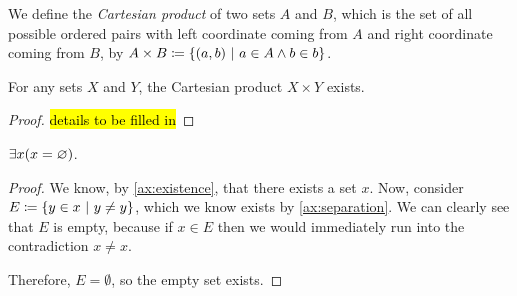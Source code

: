 % 
%         
% 
% 
% 

\begin{definition}
    We define the \emph{Cartesian product} of two sets \(A\) and \(B\),
    which is the set of all possible ordered pairs with
    left coordinate coming from \(A\) and right coordinate coming from \(B\),
    by \(A \times B \defn \set*{(a, b) \suchthat a \in A \meet b \in b}\).
\end{definition}

\begin{theorem}
    For any sets \(X\) and \(Y\), the Cartesian product \(X \times Y\) exists.
\end{theorem}
\begin{proof}
    \hl{details to be filled in}  %
\end{proof}

\begin{theorem}
    \(\exists x \pn*{x = \emptyset}\).
\end{theorem}
\begin{proof}
    We know, by \autoref{ax:existence}, that there exists a set \(x\).
    Now, consider \(E \defn \set*{y \in x \suchthat  y \neq y}\),
    which we know exists by \autoref{ax:separation}.
    We can clearly see that \(E\) is empty,
    because if \(x \in E\) then we would immediately run into the contradiction \(x \neq x\).

    Therefore, \(E = \emptyset\), so the empty set exists.
\end{proof}

